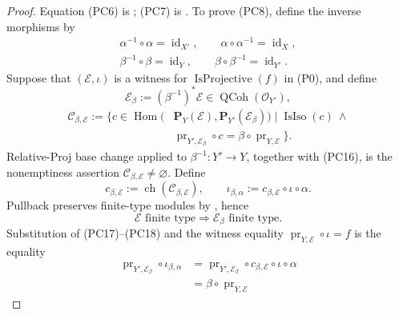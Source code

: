 \begin{proof}
  Equation (PC6) is
  \cite[\href{https://stacks.math.columbia.edu/tag/02V6}{Tag 02V6}]
  {stacks-project}; (PC7) is
  \cite[\href{https://stacks.math.columbia.edu/tag/0C4P}{Tag 0C4P}]
  {stacks-project}.  To prove (PC8), define the inverse morphisms by
  \[
  \begin{gathered}
    \alpha^{-1}\circ\alpha=\operatorname{id}_{X'},\qquad
    \alpha\circ\alpha^{-1}=\operatorname{id}_{X},\\
    \beta^{-1}\circ\beta=\operatorname{id}_{Y},\qquad
    \beta\circ\beta^{-1}=\operatorname{id}_{Y'}.
  \end{gathered}                                                  \tag{PC16}
  \]
  Suppose that $(\mathcal E,\iota)$ is a witness for
  $\operatorname{IsProjective}(f)$ in (P0), and define
  \[
    \mathcal E_{\beta}:=(\beta^{-1})^*\mathcal E\in
      \operatorname{QCoh}(\mathcal O_{Y'}),
  \]
  \[
  \begin{split}
    \mathscr C_{\beta,\mathcal E}:=
      \{c\in\operatorname{Hom}(&\mathbf P_Y(\mathcal E),
          \mathbf P_{Y'}(\mathcal E_{\beta}))\mid
      \operatorname{IsIso}(c)\ \wedge{}\\
      &\operatorname{pr}_{Y',\mathcal E_{\beta}}\circ c
        =\beta\circ\operatorname{pr}_{Y,\mathcal E}\}.
  \end{split}                                                     \tag{PC17}
  \]
  Relative-Proj base change
  \cite[\href{https://stacks.math.columbia.edu/tag/01O3}{Tag 01O3}]
  {stacks-project} applied to $\beta^{-1}\colon Y'\to Y$, together with
  (PC16), is the nonemptiness assertion
  $\mathscr C_{\beta,\mathcal E}\ne\varnothing$.  Define
  \[
    c_{\beta,\mathcal E}:=
      \operatorname{ch}(\mathscr C_{\beta,\mathcal E}),
    \qquad
    \iota_{\beta,\alpha}:=
      c_{\beta,\mathcal E}\circ\iota\circ\alpha.              \tag{PC18}
  \]
  Pullback preserves finite-type modules by
  \cite[\href{https://stacks.math.columbia.edu/tag/01B6}{Tag 01B6}]
  {stacks-project}, hence
  \[
    \mathcal E\text{ finite type}
      \Longrightarrow
    \mathcal E_{\beta}\text{ finite type}.                     \tag{PC19}
  \]
  Substitution of (PC17)--(PC18) and the witness equality
  $\operatorname{pr}_{Y,\mathcal E}\circ\iota=f$ is the equality
  \[
  \begin{aligned}
    \operatorname{pr}_{Y',\mathcal E_{\beta}}
      \circ\iota_{\beta,\alpha}
      &=\operatorname{pr}_{Y',\mathcal E_{\beta}}
        \circ c_{\beta,\mathcal E}\circ\iota\circ\alpha\\
      &=\beta\circ\operatorname{pr}_{Y,\mathcal E}

\end{aligned}\]
\end{proof}
